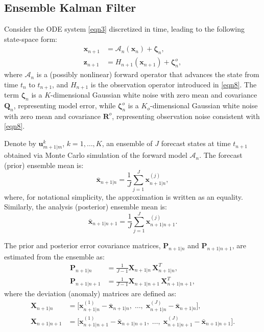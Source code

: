 \documentclass[9pt]{article}
\newcommand\bfx{\mathbf{x}}
\newcommand\bfz{\mathbf{z}}
\numberwithin{equation}{section}
\begin{document}
\subsection{Ensemble Kalman Filter}\label{EnKF}
Consider the ODE system \eqref{eqn3} discretized in time, leading to the 
following state-space form:
\begin{align}
    \bfx_{n+1} &= \mathcal{A}_n(\bfx_{n}) + \boldsymbol{\zeta}_n, 
    \label{eq:state_equation} \\
    \bfz_{n+1} &= H_{n+1}(\bfx_{n+1}) + \boldsymbol{\zeta}_n^o, 
    \label{eq:observation_equation}
\end{align}
where $\mathcal{A}_n$ is a (possibly nonlinear) forward operator that advances the state from time $t_n$ to $t_{n+1}$, and $H_{n+1}$ is the observation operator introduced in \eqref{eqn8}. The term $\boldsymbol{\zeta}_n$ is a $K$-dimensional Gaussian white noise with zero mean and covariance $\mathbf{Q}_n$, representing model error, while $\boldsymbol{\zeta}_n^o$ is a $K_o$-dimensional Gaussian white noise with zero mean and covariance $\mathbf{R}^o$, representing observation noise consistent with \eqref{eqn8}.

Denote by $\mathbf{u}_{m+1|m}^k$, $k = 1, \dots, K$, an ensemble of $J$ 
forecast states at time $t_{n+1}$ obtained via Monte Carlo simulation of the 
forward model $\mathcal{A}_n$. The forecast (prior) ensemble mean is:
\begin{equation}\label{eq:forecast_mean}
    \bar{\bfx}_{n+1|n} = \frac{1}{J} \sum_{j=1}^{J} \bfx_{n+1|n}^{(j)},
\end{equation}
where, for notational simplicity, the approximation is written as an equality. 
Similarly, the analysis (posterior) ensemble mean is:
\begin{equation}\label{eq:posterior_mean}
    \bar{\bfx}_{n+1|n+1} = \frac{1}{J} \sum_{j=1}^{J} \bfx_{n+1|n+1}^{(j)}.
\end{equation}

The prior and posterior error covariance matrices, $\mathbf{P}_{n+1|n}$ and 
$\mathbf{P}_{n+1|n+1}$, are estimated from the ensemble as:
\begin{align}
    \mathbf{P}_{n+1|n} &= \frac{1}{J - 1} 
    \mathbf{X}_{n+1|n}\,\mathbf{X}_{n+1|n}^T, 
    \label{eq:prior_covariance} \\
    \mathbf{P}_{n+1|n+1} &= \frac{1}{J - 1} 
    \mathbf{X}_{n+1|n+1}\,\mathbf{X}_{n+1|n+1}^T, 
    \label{eq:posterior_covariance}
\end{align}
where the deviation (anomaly) matrices are defined as:
\begin{align}
    \mathbf{X}_{n+1|n} &= \bigl[ \bfx_{n+1|n}^{(1)} - \bar{\bfx}_{n+1|n},
    \;\dots,\; \bfx_{n+1|n}^{(J)} - \bar{\bfx}_{n+1|n} \bigr], 
    \label{eq:deviation_prior} \\
    \mathbf{X}_{n+1|n+1} &= \bigl[ \bfx_{n+1|n+1}^{(1)} - 
    \bar{\bfx}_{n+1|n+1},\;\dots,\; \bfx_{n+1|n+1}^{(J)} - 
    \bar{\bfx}_{n+1|n+1} \bigr]. 
    \label{eq:deviation_posterior}
\end{align}
\end{document}
